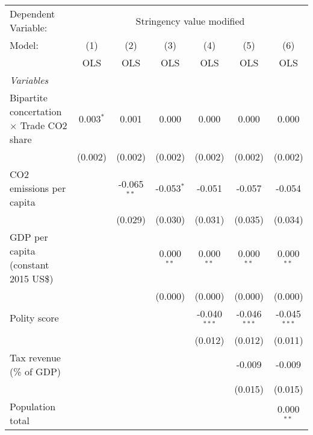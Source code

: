 
\begingroup
\centering
\begin{tabular}{lcccccc}
   \toprule
   Dependent Variable: & \multicolumn{6}{c}{Stringency value modified}\\
   Model:                                           & (1)         & (2)           & (3)          & (4)            & (5)            & (6)\\  
                                                    &  OLS        & OLS           & OLS          & OLS            & OLS            & OLS\\  
   \midrule
   \emph{Variables}\\
   Bipartite concertation $\times$ Trade CO2 share  & 0.003$^{*}$ & 0.001         & 0.000        & 0.000          & 0.000          & 0.000\\   
                                                    & (0.002)     & (0.002)       & (0.002)      & (0.002)        & (0.002)        & (0.002)\\   
   CO2 emissions per capita                         &             & -0.065$^{**}$ & -0.053$^{*}$ & -0.051         & -0.057         & -0.054\\   
                                                    &             & (0.029)       & (0.030)      & (0.031)        & (0.035)        & (0.034)\\   
   GDP per capita (constant 2015 US\$)              &             &               & 0.000$^{**}$ & 0.000$^{**}$   & 0.000$^{**}$   & 0.000$^{**}$\\   
                                                    &             &               & (0.000)      & (0.000)        & (0.000)        & (0.000)\\   
   Polity score                                     &             &               &              & -0.040$^{***}$ & -0.046$^{***}$ & -0.045$^{***}$\\   
                                                    &             &               &              & (0.012)        & (0.012)        & (0.011)\\   
   Tax revenue (\% of GDP)                          &             &               &              &                & -0.009         & -0.009\\   
                                                    &             &               &              &                & (0.015)        & (0.015)\\   
   Population total                                 &             &               &              &                &                & 0.000$^{**}$\\   

\end{tabular}
